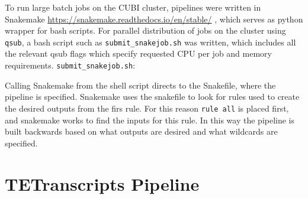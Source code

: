 \documentclass[onehalf,12pt]{beavtex}
\begin{document}
  To run large batch jobs on the CUBI cluster, pipelines were written in
  Snakemake \url{https://snakemake.readthedocs.io/en/stable/} , which
  serves as python wrapper for bash scripts. For parallel distribution of
  jobs on the cluster using \texttt{qsub}, a bash script such as
  \texttt{submit\_snakejob.sh} was written, which includes all the
  relevant qsub flags which specify requested CPU per job and memory
  requirements. \texttt{submit\_snakejob.sh}:
  
  \begin{Shaded}
  \begin{Highlighting}[]
   
   
   
  \NormalTok{ \textbackslash{}}
  \NormalTok{ \textbackslash{}}
  \end{Highlighting}
  \end{Shaded}
  
  Calling Snakemake from the shell script directs to the Snakefile, where
  the pipeline is specified. Snakemake uses the snakefile to look for
  rules used to create the desired outputs from the firs rule. For this
  reason \texttt{rule\ all} is placed first, and snakemake works to find
  the inputs for this rule. In this way the pipeline is built backwards
  based on what outputs are desired and what wildcards are specified.
  
  \section{TETranscripts Pipeline}\label{tetranscripts-pipeline}
  
\end{document}
